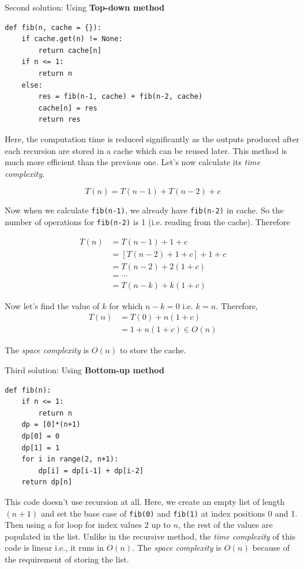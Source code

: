 \documentclass[a4paper,11pt]{book}
\begin{document}
\noindent Second solution: Using \textbf{Top-down method}

\begin{lstlisting}
def fib(n, cache = {}):
    if cache.get(n) != None:
        return cache[n]
    if n <= 1:
        return n
    else:
        res = fib(n-1, cache) + fib(n-2, cache)
        cache[n] = res
        return res
\end{lstlisting}

\noindent Here, the computation time is reduced significantly as the outputs produced after each recursion are stored in a cache which can be reused later. This method is much more efficient than the previous one. Let's now calculate its \textit{time complexity}.

$$T(n) = T(n-1) + T(n-2) + c$$

\noindent Now when we calculate \lstinline{fib(n-1)}, we already have \lstinline{fib(n-2)} in cache. So the number of operations for \lstinline{fib(n-2)} is 1 (i.e. reading from the cache). Therefore

\begin{align*}
    T(n) &= T(n-1) + 1 + c\\
         &=\left[T(n-2) + 1 + c\right] + 1 + c\\
         &=T(n-2) + 2(1+c)\\
         &= \cdots\\
         &= T(n-k) + k(1+c)
\end{align*}

\noindent Now let's find the value of $k$ for which $n-k = 0$ i.e. $k=n$. Therefore,
\begin{align*}
	T(n) &= T(0) + n(1+c)\\
	     &= 1 + n(1+c) \in O(n)
\end{align*}

\noindent The \textit{space complexity} is $O(n)$ to store the cache.
\vspace{3mm}

\noindent Third solution: Using \textbf{Bottom-up method}

\begin{lstlisting}
def fib(n):
    if n <= 1:
        return n
    dp = [0]*(n+1)
    dp[0] = 0
    dp[1] = 1 
    for i in range(2, n+1):
        dp[i] = dp[i-1] + dp[i-2]
    return dp[n]
\end{lstlisting}

\noindent This code doesn't use recursion at all. Here, we create an empty list of length $(n+1)$ and set the base case of \lstinline{fib(0)} and \lstinline{fib(1)} at index positions 0 and 1. Then using a for loop for index values 2 up to $n$, the rest of the values are populated in the list. Unlike in the recursive method, the \textit{time complexity} of this code is linear i.e., it runs in $O(n)$. The \textit{space complexity} is $O(n)$ because of the requirement of storing the list.
\end{document}
